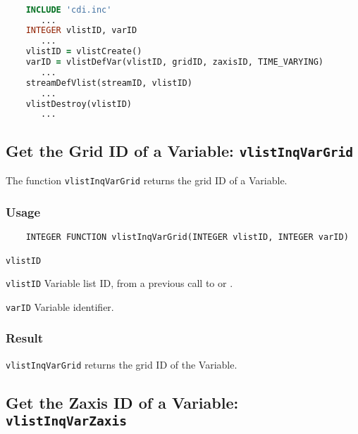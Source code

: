 \begin{lstlisting}[language=Fortran, backgroundcolor=\color{pyellow}, basicstyle=\small, columns=flexible]

    INCLUDE 'cdi.inc'
       ...
    INTEGER vlistID, varID
       ...
    vlistID = vlistCreate()
    varID = vlistDefVar(vlistID, gridID, zaxisID, TIME_VARYING)
       ...
    streamDefVlist(streamID, vlistID)
       ...
    vlistDestroy(vlistID)
       ...
\end{lstlisting}


\subsection{Get the Grid ID of a Variable: \texttt{vlistInqVarGrid}}
\label{vlistInqVarGrid}

The function {\texttt{vlistInqVarGrid}} returns the grid ID of a Variable.

\subsubsection*{Usage}

\begin{verbatim}
    INTEGER FUNCTION vlistInqVarGrid(INTEGER vlistID, INTEGER varID)
\end{verbatim}

\hspace*{4mm}\begin{minipage}[]{15cm}
\begin{deflist}{\texttt{vlistID}\ }
\item[\texttt{vlistID}]
Variable list ID, from a previous call to {} or {}.
\item[\texttt{varID}]
Variable identifier.

\end{deflist}
\end{minipage}

\subsubsection*{Result}

{\texttt{vlistInqVarGrid}} returns the grid ID of the Variable.



\subsection{Get the Zaxis ID of a Variable: \texttt{vlistInqVarZaxis}}
\label{vlistInqVarZaxis}

